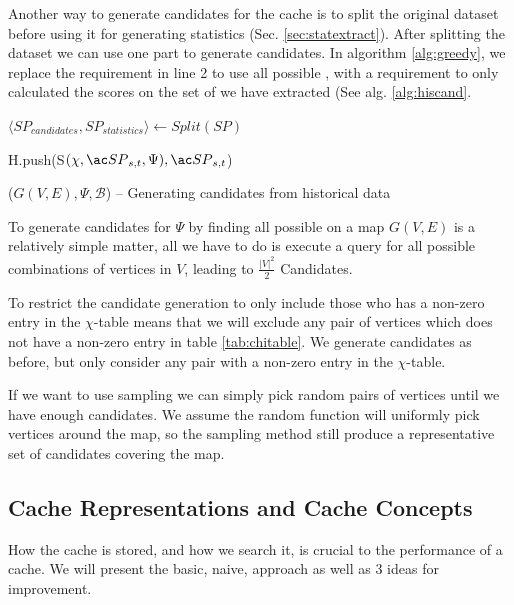 Another way to generate candidates for the cache is to split the original dataset before using it for generating statistics (Sec. \ref{sec:statextract}). 
After splitting the dataset we can use one part to generate candidates. In algorithm \ref{alg:greedy}, we replace the requirement in line 2 to use all possible \spathsns, with a requirement to only calculated the scores on the set of \spaths we have extracted (See alg. \ref{alg:hiscand}.

\begin{algorithm}[H!bt]
\dontprintsemicolon
\SetVline

$\langle SP_{candidates}, SP_{statistics} \rangle \leftarrow Split({SP})$ 

{
    H.push(S$(\chi, \spath_{s,t}, \Psi), \spath_{s,t}$) \;
}

\caption{\salgons($G(V,E), \Psi, \mathcal{B}$) -- Generating candidates from historical data}
\label{alg:hiscand}
\end{algorithm}

To generate \spath candidates for $\Psi$ by finding all possible \spath on a map $G(V,E)$ is a relatively simple matter, all we have to do is execute a \spath query for all possible combinations of vertices in $V$, leading to $\frac{|V|^2}{2}$ Candidates.

To restrict the candidate generation to only include those who has a non-zero entry in the $\chi$-table means that we will exclude any pair of vertices which does not have a non-zero entry in table \ref{tab:chitable}. We generate candidates as before, but only consider any pair with a non-zero entry in the $\chi$-table.

If we want to use sampling we can simply pick random pairs of vertices until we have enough candidates. We assume the random function will uniformly pick vertices around the map, so the sampling method still produce a representative set of candidates covering the map.


\subsection{Cache Representations and Cache Concepts} \label{subsec:cacherepresentatons}
How the cache is stored, and how we search it, is crucial to the performance of a cache. We will present the basic, naive, approach as well as 3 ideas for improvement.
% 
